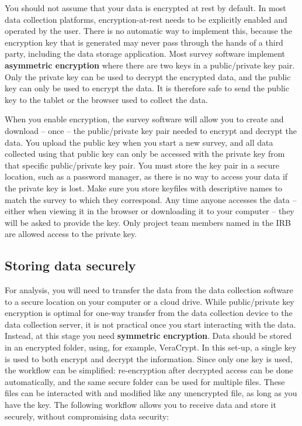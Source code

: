 You should not assume that your data is encrypted at rest by default.
In most data collection platforms,
encryption-at-rest needs to be explicitly enabled and operated by the user.
There is no automatic way to implement this,
because the encryption key that is generated may
never pass through the hands of a third party,
including the data storage application.
Most survey software implement \textbf{asymmetric encryption}
where there are two keys in a public/private key pair.
Only the private key can be used to decrypt the encrypted data,
and the public key can only be used to encrypt the data.
It is therefore safe to send the public key
to the tablet or the browser used to collect the data.

When you enable encryption, the survey software will allow you to create and
download -- once -- the public/private key pair needed to encrypt and decrypt the data.
You upload the public key when you start a new survey, and all data collected using that
public key can only be accessed with the private key from that specific public/private key pair.
You must store the key pair in a secure location, such as a password manager,
as there is no way to access your data if the private key is lost.
Make sure you store keyfiles with descriptive names to match the survey to which they correspond.
Any time anyone accesses the data --
either when viewing it in the browser or downloading it to your computer --
they will be asked to provide the key.
Only project team members named in the IRB are allowed access to the private key.

\subsection{Storing data securely}
For analysis, you will need to transfer the data from the data collection software to
a secure location on your computer or a cloud drive.
While public/private key encryption is optimal for one-way transfer
from the data collection device to the data collection server,
it is not practical once you start interacting with the data.
Instead, at this stage you need \textbf{symmetric encryption}.
Data should be stored in an encrypted folder,
using, for example, VeraCrypt.
In this set-up, a single key is used to both encrypt and decrypt the information.
Since only one key is used, the workflow can be simplified:
re-encryption after decrypted access can be done automatically,
and the same secure folder can be used for multiple files.
These files can be interacted with and modified like any unencrypted file,
 as long as you have the key.
The following workflow allows you to receive data and store it securely,
without compromising data security:

